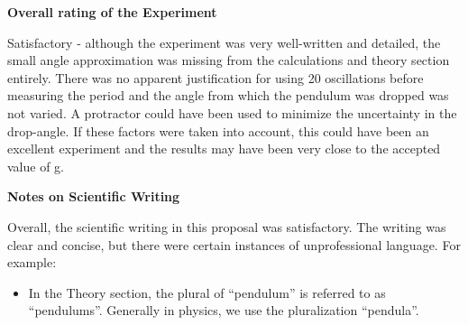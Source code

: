 \textbf{Overall rating of the Experiment}

Satisfactory - although the experiment was very well-written and detailed, the small angle approximation was missing from the calculations and theory section entirely. There was no apparent justification for using 20 oscillations before measuring the period and the angle from which the pendulum was dropped was not varied. A protractor could have been used to minimize the uncertainty in the drop-angle. If these factors were taken into account, this could have been an excellent experiment and the results may have been very close to the accepted value of g.

\textbf{Notes on Scientific Writing}

Overall, the scientific writing in this proposal was satisfactory. The writing was clear and concise, but there were certain instances of unprofessional language. For example:
\begin{itemize}
\item In the Theory section, the plural of ``pendulum'' is referred to as ``pendulums''. Generally in physics, we use the pluralization ``pendula''. 
\end{itemize}